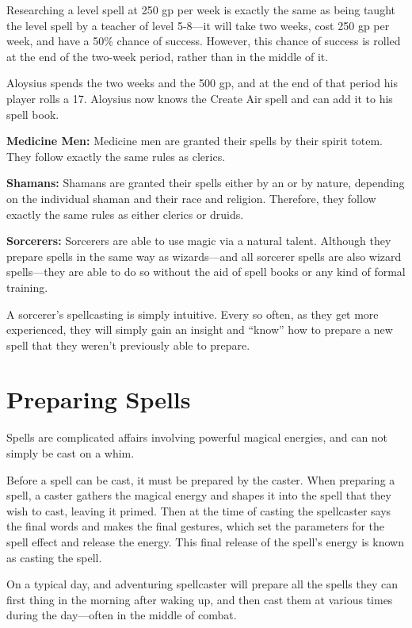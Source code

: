 \begin{multicols*}{2}
{Researching a  level spell at 250 gp per week is exactly the same as being taught the  level spell by a teacher of level 5-8—it will take two weeks, cost 250 gp per week, and have a 50\% chance of success. However, this chance of success is rolled at the end of the two-week period, rather than in the middle of it.

Aloysius spends the two weeks and the 500 gp, and at the end of that period his player rolls a 17. Aloysius now knows the Create Air spell and can add it to his spell book.}

\textbf{Medicine Men:} Medicine men are granted their spells by their spirit totem. They follow exactly the same rules as clerics.

\textbf{Shamans:} Shamans are granted their spells either by an  or by nature, depending on the individual shaman and their race and religion. Therefore, they follow exactly the same rules as either clerics or druids.

\textbf{Sorcerers:} Sorcerers are able to use magic via a natural talent. Although they prepare spells in the same way as wizards—and all sorcerer spells are also wizard spells—they are able to do so without the aid of spell books or any kind of formal training.

A sorcerer’s spellcasting is simply intuitive. Every so often, as they get more experienced, they will simply gain an insight and “know” how to prepare a new spell that they weren’t previously able to prepare.

\section{Preparing Spells}
Spells are complicated affairs involving powerful magical energies, and can not simply be cast on a whim.

Before a spell can be cast, it must be prepared by the caster. When preparing a spell, a caster gathers the magical energy and shapes it into the spell that they wish to cast, leaving it primed. Then at the time of casting the spellcaster says the final words and makes the final gestures, which set the parameters for the spell effect and release the energy. This final release of the spell’s energy is known as casting the spell.

On a typical day, and adventuring spellcaster will prepare all the spells they can first thing in the morning after waking up, and then cast them at various times during the day—often in the middle of combat.


\end{multicols*}
